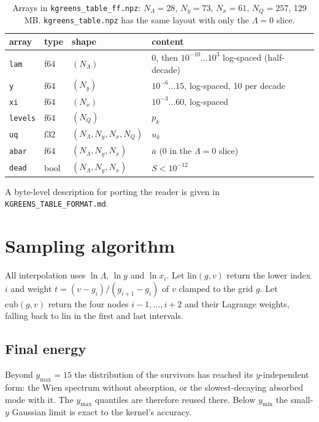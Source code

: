 \documentclass[11pt]{article}
\newcounter{algorithm}
\begin{document}
\begin{table}[h]
\centering
\begin{tabular}{llll}
\toprule
array & type & shape & content\\
\midrule
\texttt{lam} & f64 & $(N_\Lambda)$ & $0$, then $10^{-10}\ldots10^{3}$ log-spaced (half-decade)\\
\texttt{y} & f64 & $(N_y)$ & $10^{-6}\ldots15$, log-spaced, 10 per decade\\
\texttt{xi} & f64 & $(N_x)$ & $10^{-3}\ldots60$, log-spaced\\
\texttt{levels} & f64 & $(N_Q)$ & $p_k$\\
\texttt{uq} & f32 & $(N_\Lambda,N_y,N_x,N_Q)$ & $u_k$\\
\texttt{abar} & f64 & $(N_\Lambda,N_y,N_x)$ & $\bar a$ (0 in the $\Lambda=0$ slice)\\
\texttt{dead} & bool & $(N_\Lambda,N_y,N_x)$ & $S<10^{-12}$\\
\bottomrule
\end{tabular}
\caption{Arrays in \texttt{kgreens\_table\_ff.npz}:
$N_\Lambda=28$, $N_y=73$, $N_x=61$, $N_Q=257$, 129 MB.
\texttt{kgreens\_table.npz} has the same layout with only the $\Lambda=0$
slice.}
\end{table}

A byte-level description for porting the reader is given in
\texttt{KGREENS\_TABLE\_FORMAT.md}.

\section{Sampling algorithm}\label{sec:sampling}

All interpolation uses $\ln\Lambda$, $\ln y$ and $\ln x_i$. Let
$\mathrm{lin}(g,v)$ return the lower index $i$ and weight
$t=(v-g_i)/(g_{i+1}-g_i)$ of $v$ clamped to the grid $g$. Let
$\mathrm{cub}(g,v)$ return the four nodes $i-1,\dots,i+2$ and their Lagrange
weights, falling back to $\mathrm{lin}$ in the first and last intervals.

\subsection{Final energy}

Beyond $y_{\max}=15$ the distribution of the survivors has reached its
$y$-independent form: the Wien spectrum without absorption, or the
slowest-decaying absorbed mode with it. The $y_{\max}$ quantiles are
therefore reused there. Below $y_{\min}$ the small-$y$ Gaussian limit is
exact to the kernel's accuracy.
\end{document}
